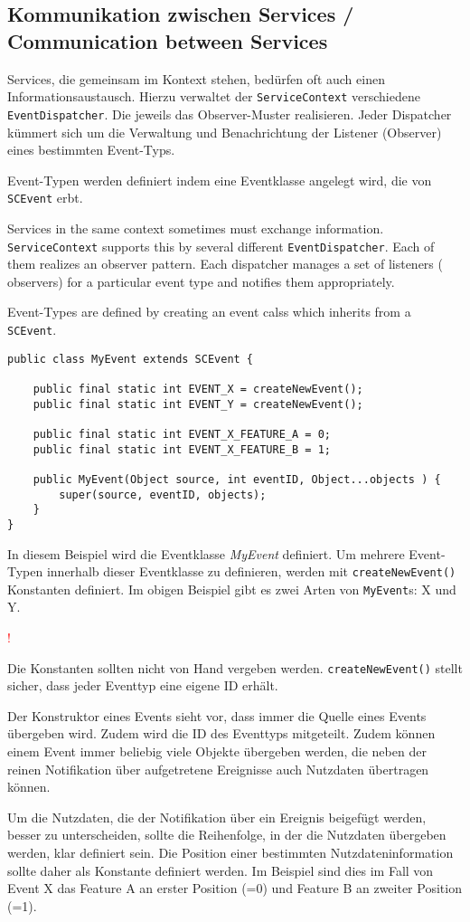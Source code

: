\documentclass[10pt,a4paper]{scrartcl}
\newcommand{\hinweis}[1]{
\begin{framed}
\begin{minipage}[t]{0.02\textwidth}
\textcolor{red}{\Huge{\sffamily !}}
\end{minipage}
\begin{minipage}[t]{0.94\textwidth}
#1
\end{minipage}
\end{framed}
}
\providecommand{\deng}[2]{#1 / {\sffamily #2}}
\providecommand{\deutsch}[1]{#1}
\providecommand{\englisch}[1]{{\sffamily #1}}
\begin{document}
\subsection{\deng{Kommunikation zwischen Services}{Communication between Services}}
\deutsch{Services, die gemeinsam im Kontext stehen, bedürfen oft auch einen
Informationsaustausch. Hierzu verwaltet der \texttt{ServiceContext} verschiedene
\texttt{EventDispatcher}. Die jeweils das Observer-Muster realisieren. Jeder
Dispatcher kümmert sich um die Verwaltung und Benachrichtung der Listener
(Observer) eines bestimmten Event-Typs.

Event-Typen werden definiert indem eine Eventklasse angelegt wird, die von 
\texttt{SCEvent} erbt.}

\englisch{Services in the same context sometimes must exchange information.
\texttt{ServiceContext} supports this by several different
\texttt{EventDispatcher}. Each of them realizes an observer pattern. Each
dispatcher manages a set of listeners ( observers) for a particular event type
and notifies them appropriately.

Event-Types are defined by creating an event calss which inherits from a 
\texttt{SCEvent}.}

\begin{lstlisting}
public class MyEvent extends SCEvent {

	public final static int EVENT_X = createNewEvent();
	public final static int EVENT_Y = createNewEvent();
	
	public final static int EVENT_X_FEATURE_A = 0;
	public final static int EVENT_X_FEATURE_B = 1;
	
	public MyEvent(Object source, int eventID, Object...objects ) {
		super(source, eventID, objects);
	}
}
\end{lstlisting}

\deutsch{In diesem Beispiel wird die Eventklasse \emph{MyEvent} definiert. Um
mehrere Event-Typen innerhalb dieser Eventklasse zu definieren, werden mit
\texttt{createNewEvent()} Konstanten definiert. Im obigen Beispiel gibt es zwei
Arten von \texttt{MyEvent}s: X und Y.

\hinweis{Die Konstanten sollten nicht von Hand vergeben werden.
\texttt{createNewEvent()} stellt sicher, dass jeder Eventtyp eine eigene ID
erhält.}

Der Konstruktor eines Events sieht vor, dass immer die Quelle eines Events
übergeben wird. Zudem wird die ID des Eventtyps mitgeteilt. Zudem können einem
Event immer beliebig viele Objekte übergeben werden, die neben der reinen
Notifikation über aufgetretene Ereignisse auch Nutzdaten übertragen können.

Um die Nutzdaten, die der Notifikation über ein Ereignis beigefügt werden,
besser zu unterscheiden, sollte die Reihenfolge, in der die Nutzdaten übergeben
werden, klar definiert sein. Die Position einer bestimmten Nutzdateninformation
sollte daher als Konstante definiert werden. Im Beispiel sind dies im Fall von
Event X das Feature A an erster Position (=0) und Feature B an zweiter Position
(=1).}
\end{document}
